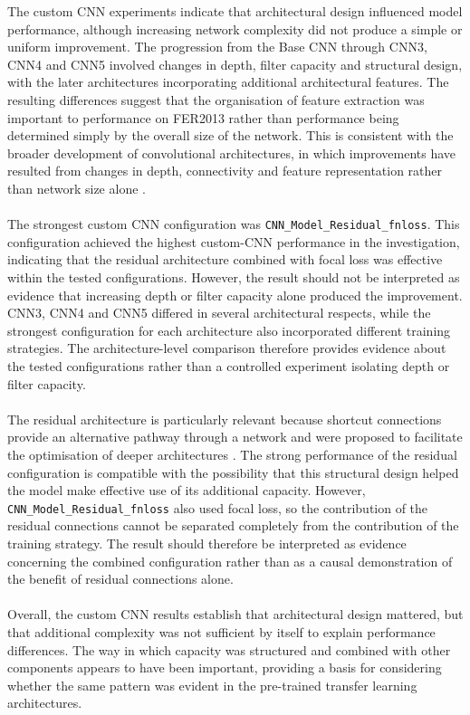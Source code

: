 \documentclass[12pt, a4paper]{report}
\begin{document}
				The custom CNN experiments indicate that architectural design influenced model performance, although increasing network complexity did not produce a simple or uniform improvement. The progression from the Base CNN through CNN3, CNN4 and CNN5 involved changes in depth, filter capacity and structural design, with the later architectures incorporating additional architectural features. The resulting differences suggest that the organisation of feature extraction was important to performance on FER2013 rather than performance being determined simply by the overall size of the network. This is consistent with the broader development of convolutional architectures, in which improvements have resulted from changes in depth, connectivity and feature representation rather than network size alone \cite{simonyan2015vgg, lin2014network}.\\\\
				The strongest custom CNN configuration was \texttt{CNN\_Model\_Residual\_fnloss}. This configuration achieved the highest custom-CNN performance in the investigation, indicating that the residual architecture combined with focal loss was effective within the tested configurations. However, the result should not be interpreted as evidence that increasing depth or filter capacity alone produced the improvement. CNN3, CNN4 and CNN5 differed in several architectural respects, while the strongest configuration for each architecture also incorporated different training strategies. The architecture-level comparison therefore provides evidence about the tested configurations rather than a controlled experiment isolating depth or filter capacity.\\\\
				The residual architecture is particularly relevant because shortcut connections provide an alternative pathway through a network and were proposed to facilitate the optimisation of deeper architectures \cite{he2016resnet}. The strong performance of the residual configuration is compatible with the possibility that this structural design helped the model make effective use of its additional capacity. However, \texttt{CNN\_Model\_Residual\_fnloss} also used focal loss, so the contribution of the residual connections cannot be separated completely from the contribution of the training strategy. The result should therefore be interpreted as evidence concerning the combined configuration rather than as a causal demonstration of the benefit of residual connections alone.\\\\
				Overall, the custom CNN results establish that architectural design mattered, but that additional complexity was not sufficient by itself to explain performance differences. The way in which capacity was structured and combined with other components appears to have been important, providing a basis for considering whether the same pattern was evident in the pre-trained transfer learning architectures.
				
\end{document}
